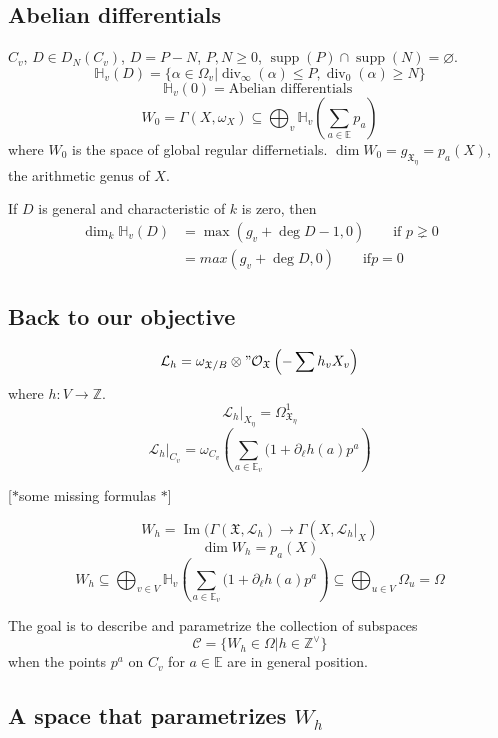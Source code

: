 \subsection{Abelian differentials}
$C_v$,  $D\in D_N(C_v)$, $D=P-N$,  $P,N\geq 0$, $\operatorname{supp}(P)\cap \operatorname{supp}(N)=\varnothing$.
\[\mathbb{H}_v(D)=\{\alpha\in\Omega_v|\operatorname{div}_\infty(\alpha)\leq P,\operatorname{div}_0(\alpha)\geq N\}\]
\[\mathbb{H}_v\left(0 \right) =\text{Abelian differentials } \]
\[W_0=\Gamma(X,\omega_X)\subseteq \bigoplus_{v} \mathbb{H}_v\left( \sum_{a\in\mathbb{E}}p_a \right)  \]
where $W_0$ is the space of global regular differnetials. $\dim W_0=g_{\mathfrak{X}_\eta}=p_a(X)$, the arithmetic genus of $X$.

If $D$ is general and characteristic of  $k$ is zero, then 
\begin{align*}\dim_k \mathbb{H}_v(D)&=\max(g_v+\operatorname{deg}D-1,0)\qquad \text{if }p\gneq 0\\
&=max(g_v+\operatorname{deg}D,0)\qquad \text{if} p=0\end{align*}

\subsection{Back to our objective}

\[\mathcal{L}_{h}=\omega_{\mathfrak{X} /B}\otimes"\mathcal{O}_{\mathfrak{X} }\left( -\sum h_vX_v \right) \]
where $h:V\longrightarrow \mathbb{Z}$.
\[\mathcal{L}_{h}|_{X_\eta}=\Omega^1_{\mathfrak{X}_\eta}\]
\[\mathcal{L}_{h}|_{C_v}=\omega_{C_v}\left( \sum_{a\in\mathbb{E}_{v}} (1+\partial_{\ell}h(a)p^a \right) \]

[$*$some missing formulas $*$]

\[W_h=\operatorname{Im}(\Gamma(\mathfrak{X},\mathcal{L}_{h})\longrightarrow \Gamma(X,\mathcal{L}_{h}|_{X})\]
\[\dim W_h=p_a(X)\]
\[W_h\subseteq \bigoplus_{v\in V}\mathbb{H}_v\left( \sum_{a\in\mathbb{E}_v}(1+\partial_\ell h(a)p^a \right) \subseteq \bigoplus_{u\in V}\Omega_u    =\Omega\]

\begin{thing2}{The goal}\leavevmode
	is to describe and parametrize the collection of subspaces
	\[\mathcal{C}=\{W_h\in\Omega|h\in\mathbb{Z}^\vee\}\]
	when the points $p^a$ on  $C_v$ for  $a \in  \mathbb{E}$ are in general position.
\end{thing2}

\subsection{A space that parametrizes $W_h$}

